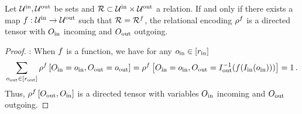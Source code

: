 \begin{theorem}
    \label{the:rencodingDirected}
    Let $\mathcal{U}^{\mathrm{in}},\mathcal{U}^{\mathrm{out}}$ be sets and $\mathcal{R}\subset\mathcal{U}^{\mathrm{in}}\times\mathcal{U}^{\mathrm{out}}$ a relation.
    If and only if there exists a map $f:\mathcal{U}^{\mathrm{in}}\rightarrow\mathcal{U}^{\mathrm{out}}$ such that $\mathcal{R}=\mathcal{R}^{f}$, the relational encoding $\rho^{f}$ is a directed tensor with $O_{\mathrm{in}}$ incoming and $O_{\mathrm{out}}$ outgoing.
\end{theorem}
\begin{proof}
    \proofrightsymbol:
    When $f$ is a function, we have for any $o_{\mathrm{in}}\in[r_{\mathrm{in}}]$
    \begin{align*}
        \sum_{o_{\mathrm{out}}\in[r_{\mathrm{out}}]} \rho^{f}\left[O_{\mathrm{in}}=o_{\mathrm{in}},O_{\mathrm{out}}=o_{\mathrm{out}}\right]
        =  \rho^{f}\left[O_{\mathrm{in}}=o_{\mathrm{in}},O_{\mathrm{out}}=I_{\mathrm{out}}^{-1}(f(I_{\mathrm{in}}(o_{\mathrm{in}})))\right]
        = 1 \, .
    \end{align*}
    Thus, $\rho^{f}\left[O_{\mathrm{out}},O_{\mathrm{in}}\right]$ is a directed tensor with variables $O_{\mathrm{in}}$ incoming and $O_{\mathrm{out}}$ outgoing.


\end{proof}
